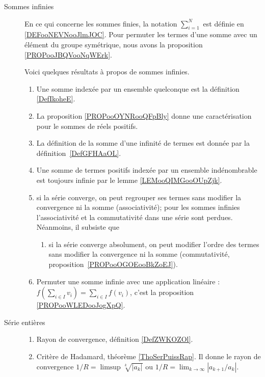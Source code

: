 \begin{description}
	\item[Sommes infinies]
	      En ce qui concerne les sommes finies, la notation \( \sum_{i=1}^N\) est définie en \ref{DEFooNEVNooJlmJOC}. Pour permuter les termes d'une somme avec un élément du groupe symétrique, nous avons la proposition \ref{PROPooJBQVooNqWErk}.

	      Voici quelques résultats à propos de sommes infinies.%
	      \begin{enumerate}
		      \item
		            Une somme indexée par un ensemble quelconque est la définition \ref{DefIkoheE}.
		      \item
		            La proposition \ref{PROPooOYNRooQFpBly} donne une caractérisation pour le sommes de réels positifs.
		      \item
		            La définition de la somme d'une infinité de termes est donnée par la définition~\ref{DefGFHAaOL}.
		      \item
		            Une somme de termes positifs indexée par un ensemble indénombrable est toujours infinie par le lemme \ref{LEMooQIMGooOUpZjk}.
		      \item
		            si la série converge, on peut regrouper ses termes sans modifier la convergence ni la somme (associativité);
		            pour les sommes infinies l'associativité et la commutativité dans une série sont perdues. Néanmoins, il subsiste que
		            \begin{enumerate}
			            \item
			                  si la série converge absolument, on peut modifier l'ordre des termes sans modifier la convergence ni la somme (commutativité, proposition~\ref{PROPooOGOEooBkZoEJ}).
		            \end{enumerate}
		      \item Permuter une somme infinie avec une application linéaire : \( f(\sum_{i\in I}v_i)=\sum_{i\in I}f(v_i)\), c'est la proposition \ref{PROPooWLEDooJogXpQ}.
	      \end{enumerate}
	\item[Série entières]
	      \begin{enumerate}
		      \item
		            Rayon de convergence, définition \ref{DefZWKOZOl}.
		      \item
		            Critère de Hadamard, théorème \ref{ThoSerPuissRap}. Il donne le rayon de convergence \( 1/R=\limsup \sqrt[k]{| a_k |}\) ou \( 1/R=\lim_{k\to \infty}| a_{k+1}/a_k |\).

\end{enumerate}
\end{description}
